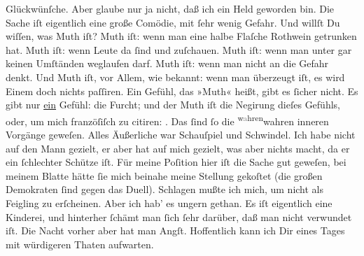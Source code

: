\begin{ledgroupsized}[t]{13cm}
               Glückwünſche. Aber glaube nur  ja nicht, daß ich
               ein  Held geworden bin. Die Sache iſt eigentlich
               eine große Comödie, mit ſehr wenig Gefahr. Und willſt Du {\pb}wiſſen, was Muth iſt? Muth iſt: wenn man \label{K_L02791-3v}\label{K_L02791-3h} eine halbe Flaſche Rothwein
               getrunken hat. Muth iſt: wenn Leute da ſind und zuſchauen. Muth iſt: wenn man unter
               gar keinen Umſtänden weglaufen darf. Muth iſt: wenn man nicht an die Gefahr denkt.
               Und Muth iſt, vor Allem, wie bekannt: wenn man überzeugt iſt, es wird Einem doch
               nichts paſſiren.\pend
           \pstart
           Ein Gefühl, das »Muth« heißt, gibt es ſicher nicht. Es gibt nur \uline{ein} Gefühl: die Furcht; und der Muth iſt die Negirung dieſes {\pb}Gefühls, oder, um mich franzöſiſch zu citiren:
                  \label{K_L02791-55v}\label{K_L02791-55h}.\pend
           \pstart
           Das ſind ſo die \substVorne{}\textsuperscript{w\textcolor{gray}{a}hren}{\allowbreak}\substDazwischen{}wahren\substHinten{} inneren Vorgänge geweſen. Alles Äußerliche war Schauſpiel und Schwindel. Ich
               habe nicht auf den Mann
               gezielt, er aber hat auf mich gezielt, was aber nichts macht, da  er ein ſchlechter Schütze iſt. Für meine Poſition hier iſt die Sache gut
               geweſen, bei meinem Blatte
               hätte ſie mich beinahe meine Stellung gekoſtet (die großen Demokraten ſind gegen das
               Duell). Schlagen mußte ich mich, um nicht als {\pb}Feigling zu erſcheinen. Aber ich hab’ es ungern gethan. Es iſt eigentlich eine
               Kinderei, und hinterher ſchämt man ſich ſehr darüber, daß man nicht verwundet iſt.
               Die Nacht vorher aber hat man Angſt.\pend
           \pstart
           Hoffentlich kann ich Dir eines Tages mit würdigeren Thaten aufwarten.\pend

\end{ledgroupsized}
